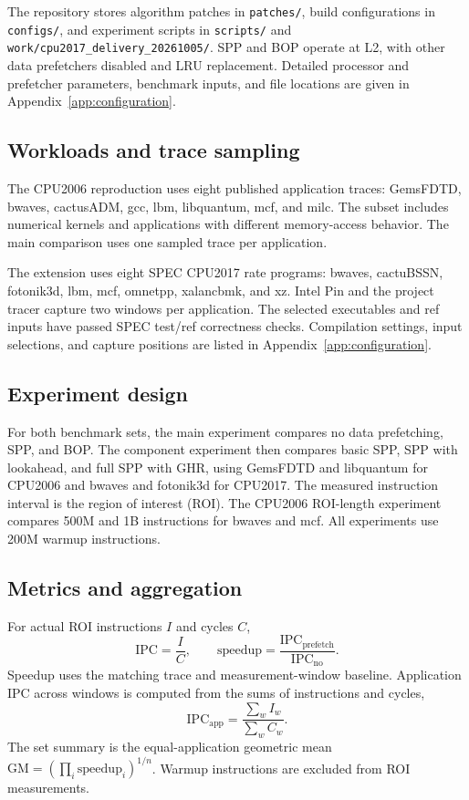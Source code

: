 \documentclass[a4paper,11pt]{article}
\newcommand{\code}[1]{\texttt{#1}}
\begin{document}
The repository stores algorithm patches in \code{patches/}, build configurations in \code{configs/}, and experiment scripts in \code{scripts/} and \code{work/cpu2017\_delivery\_20261005/}. SPP and BOP operate at L2, with other data prefetchers disabled and LRU replacement. Detailed processor and prefetcher parameters, benchmark inputs, and file locations are given in Appendix~\ref{app:configuration}.

\subsection{Workloads and trace sampling}
The CPU2006 reproduction uses eight published application traces: GemsFDTD, bwaves, cactusADM, gcc, lbm, libquantum, mcf, and milc\cite{trace2006}. The subset includes numerical kernels and applications with different memory-access behavior. The main comparison uses one sampled trace per application.

The extension uses eight SPEC CPU2017 rate programs: bwaves, cactuBSSN, fotonik3d, lbm, mcf, omnetpp, xalancbmk, and xz\cite{spec2017}. Intel Pin\cite{pin} and the project tracer capture two windows per application. The selected executables and ref inputs have passed SPEC test/ref correctness checks. Compilation settings, input selections, and capture positions are listed in Appendix~\ref{app:configuration}.

\subsection{Experiment design}
For both benchmark sets, the main experiment compares no data prefetching, SPP, and BOP. The component experiment then compares basic SPP, SPP with lookahead, and full SPP with GHR, using GemsFDTD and libquantum for CPU2006 and bwaves and fotonik3d for CPU2017. The measured instruction interval is the region of interest (ROI). The CPU2006 ROI-length experiment compares 500M and 1B instructions for bwaves and mcf. All experiments use 200M warmup instructions.

\subsection{Metrics and aggregation}
For actual ROI instructions $I$ and cycles $C$,
\[
\mathrm{IPC}=\frac{I}{C},\qquad
\mathrm{speedup}=\frac{\mathrm{IPC}_{\mathrm{prefetch}}}{\mathrm{IPC}_{\mathrm{no}}}.
\]
Speedup uses the matching trace and measurement-window baseline. Application IPC across windows is computed from the sums of instructions and cycles,
\[
\mathrm{IPC}_{\mathrm{app}}=\frac{\sum_w I_w}{\sum_w C_w}.
\]
The set summary is the equal-application geometric mean $\mathrm{GM}=(\prod_i\mathrm{speedup}_i)^{1/n}$. Warmup instructions are excluded from ROI measurements.
\end{document}
